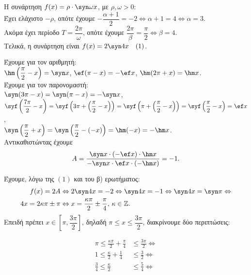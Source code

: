 \documentclass[11pt,a4paper,twoside]{book}
\begin{document}
\begin{alist}
\item Η συνάρτηση $f(x) = \rho \cdot \syn \omega x$, με $\rho, \omega > 0$: \\
Έχει ελάχιστο $-\rho$, οπότε έχουμε $-\dfrac{\alpha+1}{2} = -2 \Leftrightarrow \alpha + 1 = 4 \Leftrightarrow \alpha = 3$. \\
Ακόμα έχει περίοδο $T = \dfrac{2\pi}{\omega}$, οπότε έχουμε $\dfrac{2\pi}{\beta} = \dfrac{\pi}{2} \Leftrightarrow \beta = 4$. \\
Τελικά, η συνάρτηση είναι $f(x) = 2\syn  4x \quad(1)$.
\item Έχουμε για τον αριθμητή: \\
$\hm \left(\dfrac{\pi}{2} - x\right) = \syn  x$, $\ef (\pi - x) = -\ef  x$, $\hm (2\pi + x) = \hm  x$. \\
Έχουμε για τον παρονομαστή: \\
$\syn (3\pi - x) = \syn (\pi - x) = -\syn  x$, \\
$\syf \left(\dfrac{7\pi}{2} - x\right) = \syf \left(3\pi + \left(\dfrac{\pi}{2} - x\right)\right) = \syf \left(\pi + \left(\dfrac{\pi}{2} - x\right)\right) = \syf \left(\dfrac{\pi}{2} - x\right) = \ef  x$, \\
$\syn \left(\dfrac{\pi}{2} + x\right) = \syn \left(\dfrac{\pi}{2} - (-x)\right) = \hm (-x) = -\hm  x$. \\
Αντικαθιστώντας έχουμε 
\[A = \frac{\syn  x \cdot (-\ef  x) \cdot \hm  x}{-\syn  x \cdot \ef  x \cdot (-\hm  x)} = -1.\]
\item Έχουμε, λόγω της $(1)$ και του β) ερωτήματος:
\begin{align*}
f(x) = 2A &\Leftrightarrow 2\syn  4x = -2 \Leftrightarrow \syn  4x = -1 \Leftrightarrow \syn  4x = \syn \pi \Leftrightarrow \\
4x = 2\kappa\pi \pm \pi &\Leftrightarrow x = \frac{\kappa\pi}{2} \pm \frac{\pi}{4}, \, \kappa \in \mathbb{Z}.
\end{align*}
Επειδή πρέπει $x \in \left[\pi, \dfrac{3\pi}{2}\right]$, δηλαδή $\pi \le x \le \dfrac{3\pi}{2}$, διακρίνουμε δύο περιπτώσεις:
\begin{center}
\begin{minipage}[t]{0.45\textwidth}
\begin{align*}
\pi \le \frac{\kappa\pi}{2} + \frac{\pi}{4} &\le \frac{3\pi}{2} \Leftrightarrow \\
1 \le \frac{\kappa}{2} + \frac{1}{4} &\le \frac{3}{2} \Leftrightarrow \\
\frac{3}{4} \le \frac{\kappa}{2} &\le \frac{5}{4} \Leftrightarrow \\

\end{align*}
\end{minipage}
\end{center}
\end{alist}
\end{document}

